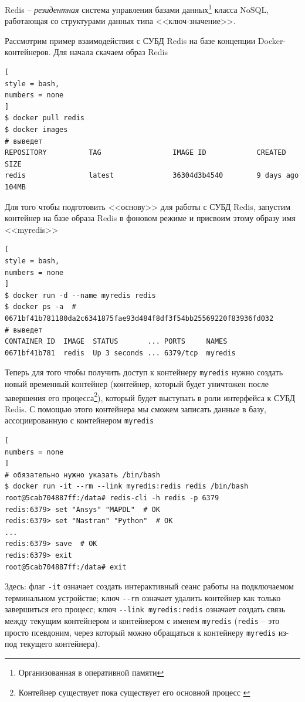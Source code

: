 \documentclass[%
	11pt,
	a4paper,
	utf8,
		]{article}
\begin{document}
Redis -- \emph{резидентная} система управления базами данных\footnote{Организованная в оперативной памяти} класса NoSQL, работающая со структурами данных типа <<ключ-значение>>.

Рассмотрим пример взаимодействия с СУБД Redis на базе концепции Docker-контейнеров. Для начала скачаем образ Redis
\begin{lstlisting}[
style = bash,
numbers = none
]
$ docker pull redis
$ docker images
# выведет
REPOSITORY          TAG                 IMAGE ID            CREATED             SIZE
redis               latest              36304d3b4540        9 days ago          104MB
\end{lstlisting}

Для того чтобы подготовить <<основу>> для работы с СУБД Redis, запустим контейнер на базе образа Redis в фоновом режиме и присвоим этому образу имя <<myredis>>
\begin{lstlisting}[
style = bash,
numbers = none
]
$ docker run -d --name myredis redis
$ docker ps -a  # 0671bf41b781180da2c6341875fae93d484f8df3f54bb25569220f83936fd032
# выведет
CONTAINER ID  IMAGE  STATUS       ... PORTS     NAMES
0671bf41b781  redis  Up 3 seconds ... 6379/tcp  myredis
\end{lstlisting}

Теперь для того чтобы получить доступ к контейнеру \texttt{myredis} нужно создать новый временный контейнер (контейнер, который будет уничтожен после завершения его процесса\footnote{Контейнер существует пока существует его основной процесс \cite{mouat:docker-2017}}), который будет выступать в роли интерфейса к СУБД Redis. С помощью этого контейнера мы сможем записать данные в базу, ассоциированную с контейнером \texttt{myredis}
\begin{lstlisting}[
numbers = none
]
# обязательно нужно указать /bin/bash
$ docker run -it --rm --link myredis:redis redis /bin/bash
root@5cab704887ff:/data# redis-cli -h redis -p 6379
redis:6379> set "Ansys" "MAPDL"  # OK
redis:6379> set "Nastran" "Python"  # OK
...
redis:6379> save  # OK
redis:6379> exit
root@5cab704887ff:/data# exit
\end{lstlisting}

Здесь: флаг \verb|-it| означает создать интерактивный сеанс работы на подключаемом терминальном устройстве; ключ \verb|--rm| означает удалить контейнер как только завершиться его процесс; ключ \verb|--link myredis:redis| означает создать связь между текущим контейнером и контейнером с именем \texttt{myredis} (\texttt{redis} -- это просто псевдоним, через который можно обращаться к контейнеру \texttt{myredis} из-под текущего контейнера).
\end{document}
